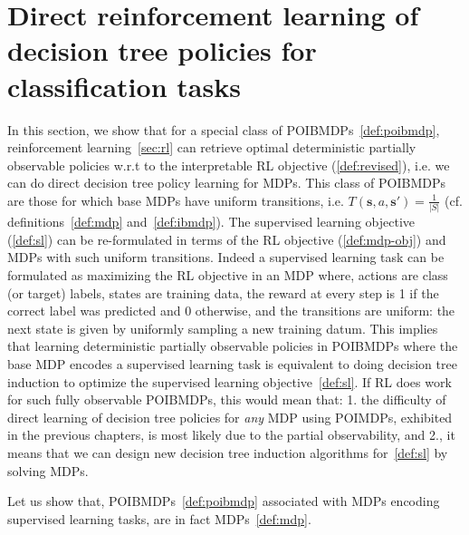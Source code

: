 \chapter{Direct reinforcement learning of decision tree policies for classification tasks}\label{sec:pomdp-classif}
In this section, we show that for a special class of POIBMDPs~\ref{def:poibmdp}, reinforcement learning~\ref{sec:rl} can retrieve optimal deterministic partially observable policies w.r.t to the interpretable RL objective (\ref{def:revised}), i.e. we can do direct decision tree policy learning for MDPs.
This class of POIBMDPs are those for which base MDPs have uniform transitions, i.e. $T(\boldsymbol{s}, a, \boldsymbol{s}') = \frac{1}{|S|}$ (cf. definitions~\ref{def:mdp} and~\ref{def:ibmdp}).
The supervised learning objective (\ref{def:sl}) can be re-formulated in terms of the RL objective (\ref{def:mdp-obj}) and MDPs with such uniform transitions.
Indeed a supervised learning task can be formulated as maximizing the RL objective in an MDP where, actions are class (or target) labels, states are training data, the reward at every step is 1 if the correct label was predicted and 0 otherwise, and the transitions are uniform: the next state is given by uniformly sampling a new training datum. 
This implies that learning deterministic partially observable policies in POIBMDPs where the base MDP encodes a supervised learning task is equivalent to doing decision tree induction to optimize the supervised learning objective~\ref{def:sl}.
If RL does work for such fully observable POIBMDPs, this would mean that: 1. the difficulty of direct learning of decision tree policies for \textit{any} MDP using POIMDPs, exhibited in the previous chapters, is most likely due to the partial observability, and 2., it means that we can design new decision tree induction algorithms for~\ref{def:sl} by solving MDPs.

Let us show that, POIBMDPs~\ref{def:poibmdp} associated with MDPs encoding supervised learning tasks, are in fact MDPs~\ref{def:mdp}.

